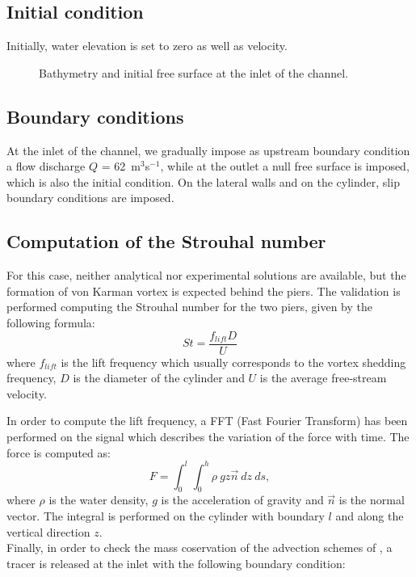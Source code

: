 \subsection{Initial condition}

Initially, water elevation is set to zero as well as velocity.

\begin{figure}[H]
 \centering
 \caption{Bathymetry and initial free surface at the inlet of the channel.}
 \label{fig:init:bridge}
\end{figure}

\subsection{Boundary conditions}

At the inlet of the channel, we gradually impose as upstream boundary condition
a flow discharge $Q$ = 62~m$^3$s$^{-1}$, while at the outlet a null free surface
is imposed, which is also the initial condition.
On the lateral walls and on the cylinder, slip boundary conditions are imposed.

\subsection{Computation of the Strouhal number}

For this case, neither analytical nor experimental solutions are available, but
the formation of von Karman vortex is expected behind the piers.
The validation is performed computing the Strouhal number for the two piers,
given by the following formula:
\begin{equation*}
St=\frac{f_{lift}D}{U}
\end{equation*}
where $f_{lift}$ is the lift frequency which usually corresponds to the vortex
shedding frequency, $D$ is the diameter of the cylinder and $U$ is the average
free-stream velocity.

In order to compute the lift frequency, a FFT (Fast Fourier Transform) has been
performed on the signal which describes the variation of the force with time.
The force is computed as:
\begin{equation*}
F=\int_0^l\int_0^h \rho~gz \vec{n}~dz~ds,
\end{equation*}
where $\rho$ is the water density, $g$ is the acceleration of gravity and
$\vec{n}$ is the normal vector.
The integral is performed on the cylinder with boundary $l$ and along the
vertical direction $z$.\\
Finally, in order to check the mass coservation of the advection schemes of
, a tracer is released at the inlet with the following boundary condition:

